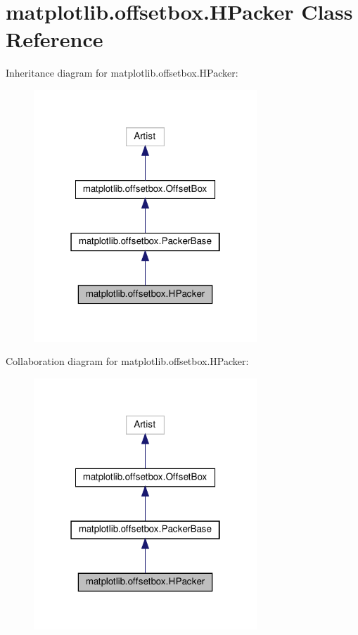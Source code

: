 \hypertarget{classmatplotlib_1_1offsetbox_1_1HPacker}{}\section{matplotlib.\+offsetbox.\+H\+Packer Class Reference}
\label{classmatplotlib_1_1offsetbox_1_1HPacker}


Inheritance diagram for matplotlib.\+offsetbox.\+H\+Packer\+:
\nopagebreak
\begin{figure}[H]
\begin{center}
\leavevmode
\includegraphics[width=238pt]{classmatplotlib_1_1offsetbox_1_1HPacker__inherit__graph}
\end{center}
\end{figure}


Collaboration diagram for matplotlib.\+offsetbox.\+H\+Packer\+:
\nopagebreak
\begin{figure}[H]
\begin{center}
\leavevmode
\includegraphics[width=238pt]{classmatplotlib_1_1offsetbox_1_1HPacker__coll__graph}
\end{center}
\end{figure}

